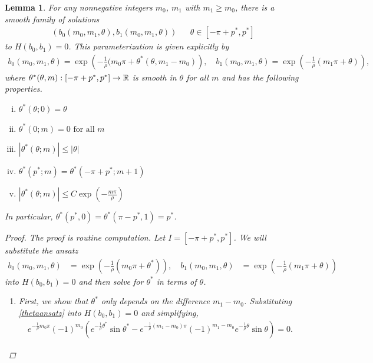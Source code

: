 \documentclass[10pt,reqno]{amsart}
\theoremstyle{plain}
\newtheorem{lemma}[theorem]{Lemma}
\theoremstyle{definition}
\theoremstyle{remark}
\numberwithin{theorem}{section}
\numberwithin{equation}{section}
\begin{document}
\begin{lemma}\label{thetaparamlemma}
For any nonnegative integers $m_0$, $m_1$ with $m_1 \geq m_0$, there is a smooth family of solutions
\begin{align*}
\left( b_0( m_0, m_1, \theta), b_1( m_0, m_1, \theta) \right) && \theta \in [-\pi + p^*, p^*]
\end{align*}
to $H(b_0, b_1) = 0$. This parameterization is given explicitly by
\begin{equation}\label{thetaparam}
\begin{aligned}
b_0( m_0, m_1, \theta) = \exp\left( -\frac{1}{\rho}(m_0 \pi + \theta^*(\theta, m_1 - m_0) \right), \quad
b_1( m_0, m_1, \theta) = \exp\left( -\frac{1}{\rho}(m_1 \pi + \theta) \right),
\end{aligned}
\end{equation}
where $\theta^*(\theta, m) : [-\pi + p^*, p^*] \rightarrow \mathbb{R}$ is smooth in $\theta$ for all $m$ and has the following properties.
\begin{enumerate}[(i)]
\item $\theta^*(\theta; 0) = \theta $
\item $\theta^*(0; m) = 0 \text{ for all } m$
\item $|\theta^*(\theta; m)| \leq |\theta|$
\item $\theta^*(p^*; m) = \theta^*(-\pi+p^*; m+1)$
\item $|\theta^*(\theta; m)| \leq C \exp\left(-\frac{m \pi}{\rho} \right)$
\end{enumerate}
In particular, $\theta^*(p^*, 0) = \theta^*(\pi - p^*, 1) = p^*$.
\begin{proof}
The proof is routine computation. Let $I = [-\pi + p^*, p^*]$. We will substitute the ansatz 
\begin{equation}\label{thetaansatz}
\begin{aligned}
b_0( m_0, m_1, \theta) &= \exp\left(-\frac{1}{\rho}(m_0 \pi + \theta^*) \right), \quad
b_1( m_0, m_1, \theta) &= \exp\left(-\frac{1}{\rho}(m_1 \pi + \theta) \right)
\end{aligned}
\end{equation}
into $H(b_0, b_1) = 0$ and then solve for $\theta^*$ in terms of $\theta$.
\begin{enumerate}
\item First, we show that $\theta^*$ only depends on the difference $m_1 - m_0$. Substituting \cref{thetaansatz} into $H(b_0, b_1) = 0$ and simplifying,
\begin{align*}
e^{-\frac{1}{\rho}m_0 \pi} (-1)^{m_0} \left( e^{-\frac{1}{\rho}\theta^*}\sin \theta^* - e^{-\frac{1}{\rho}(m_1 - m_0) \pi} (-1)^{m_1 - m_0} e^{-\frac{1}{\rho}\theta}\sin \theta \right) = 0.

\end{align*}
\end{enumerate}
\end{proof}
\end{lemma}
\end{document}
